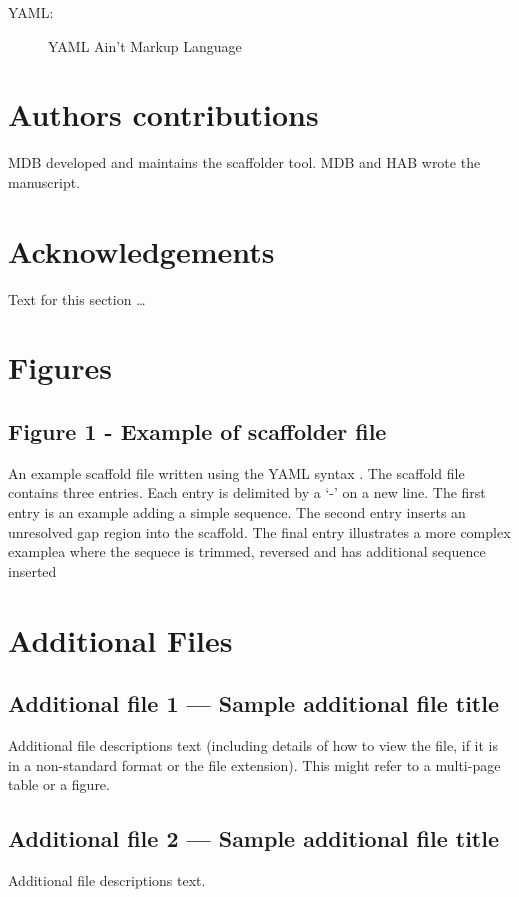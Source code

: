 \documentclass[10pt]{bmc_article}
\newenvironment{bmcformat}{\begin{raggedright}\baselineskip20pt\sloppy\setboolean{publ}{false}}{\end{raggedright}\baselineskip20pt\sloppy}
\begin{document}
\begin{bmcformat}
  \begin{description}
    \item[YAML:] YAML Ain't Markup Language\cite{yaml}
  \end{description}

\section*{Authors contributions} %

MDB developed and maintains the scaffolder tool. MDB and HAB wrote the
manuscript.

\section*{Acknowledgements} %
  Text for this section \ldots

{
   }     %


\section*{Figures} %

\subsection*{Figure 1 - Example of scaffolder file}

An example scaffold file written using the YAML syntax \cite{yaml}. The
scaffold file contains three entries. Each entry is delimited by a `-' on a new
line. The first entry is an example adding a simple sequence. The second entry
inserts an unresolved gap region into the scaffold. The final entry illustrates
a more complex examplea where the sequece is trimmed, reversed and has
additional sequence inserted \pb

\section*{Additional Files} %

  \subsection*{Additional file 1 --- Sample additional file title}
    Additional file descriptions text (including details of how to
    view the file, if it is in a non-standard format or the file extension).  This might
    refer to a multi-page table or a figure.

  \subsection*{Additional file 2 --- Sample additional file title}
    Additional file descriptions text.


\end{bmcformat}
\end{document}
